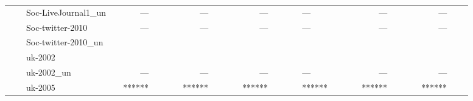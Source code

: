 \begin{sidewaystable*}[t!]
\begin{tabular}{|c|c|l|r|r|r|r|r|r|r|r|r|r|r|r|r|l|r|r|r|r|r|r|r|r|r|r|}
\multicolumn{ 1}{|c|}{} & \multicolumn{ 1}{c|}{} & Soc-LiveJournal1\_un & \multicolumn{1}{l|}{} & --- & \multicolumn{1}{l|}{} &  & \multicolumn{1}{l|}{} & --- &  &  & \multicolumn{1}{l|}{} & --- &  & \multicolumn{1}{l|}{} & \multicolumn{1}{l|}{} & --- &  & \multicolumn{1}{l|}{} & \multicolumn{1}{l|}{} & --- & \multicolumn{1}{l|}{} & \multicolumn{1}{l|}{} & \multicolumn{1}{l|}{} & --- & \multicolumn{1}{l|}{} & \multicolumn{1}{l|}{} \\ \cline{ 3- 27}
\multicolumn{ 1}{|c|}{} & \multicolumn{ 1}{c|}{} & Soc-twitter-2010 & \multicolumn{1}{l|}{} & --- & \multicolumn{1}{l|}{} &  & \multicolumn{1}{l|}{} & --- &  &  & \multicolumn{1}{l|}{} & --- &  & \multicolumn{1}{l|}{} & \multicolumn{1}{l|}{} & --- &  & \multicolumn{1}{l|}{} & \multicolumn{1}{l|}{} & --- & \multicolumn{1}{l|}{} & \multicolumn{1}{l|}{} & \multicolumn{1}{l|}{} & --- & \multicolumn{1}{l|}{} & \multicolumn{1}{l|}{} \\ \cline{ 3- 27}
\multicolumn{ 1}{|c|}{} & \multicolumn{ 1}{c|}{} & Soc-twitter-2010\_un & \multicolumn{1}{l|}{} &  & \multicolumn{1}{l|}{} &  & \multicolumn{1}{l|}{} &  &  &  & \multicolumn{1}{l|}{} &  &  & \multicolumn{1}{l|}{} & \multicolumn{1}{l|}{} &  &  & \multicolumn{1}{l|}{} & \multicolumn{1}{l|}{} &  & \multicolumn{1}{l|}{} & \multicolumn{1}{l|}{} & \multicolumn{1}{l|}{} &  & \multicolumn{1}{l|}{} & \multicolumn{1}{l|}{} \\ \cline{ 3- 27}
\multicolumn{ 1}{|c|}{} & \multicolumn{ 1}{c|}{} & uk-2002 & \multicolumn{1}{l|}{} &  & \multicolumn{1}{l|}{} &  & \multicolumn{1}{l|}{} &  &  &  & \multicolumn{1}{l|}{} &  &  & \multicolumn{1}{l|}{} & \multicolumn{1}{l|}{} &  &  & \multicolumn{1}{l|}{} & \multicolumn{1}{l|}{} &  & \multicolumn{1}{l|}{} & \multicolumn{1}{l|}{} & \multicolumn{1}{l|}{} &  & \multicolumn{1}{l|}{} & \multicolumn{1}{l|}{} \\ \cline{ 3- 27}
\multicolumn{ 1}{|c|}{} & \multicolumn{ 1}{c|}{} & uk-2002\_un & \multicolumn{1}{l|}{} & --- & \multicolumn{1}{l|}{} &  & \multicolumn{1}{l|}{} & --- &  &  & \multicolumn{1}{l|}{} & --- &  & \multicolumn{1}{l|}{} & \multicolumn{1}{l|}{} & --- &  & \multicolumn{1}{l|}{} & \multicolumn{1}{l|}{} & --- & \multicolumn{1}{l|}{} & \multicolumn{1}{l|}{} & \multicolumn{1}{l|}{} & --- & \multicolumn{1}{l|}{} & \multicolumn{1}{l|}{} \\ \cline{ 3- 27}
\multicolumn{ 1}{|c|}{} & \multicolumn{ 1}{c|}{} & uk-2005 & \multicolumn{1}{l|}{} & ****** & \multicolumn{1}{l|}{} &  & \multicolumn{1}{l|}{} & ****** &  &  & \multicolumn{1}{l|}{} & ****** &  & \multicolumn{1}{l|}{} & \multicolumn{1}{l|}{} & ****** &  & \multicolumn{1}{l|}{} & \multicolumn{1}{l|}{} & ****** & \multicolumn{1}{l|}{} & \multicolumn{1}{l|}{} & \multicolumn{1}{l|}{} & ****** & \multicolumn{1}{l|}{} & \multicolumn{1}{l|}{} \\ \cline{ 3- 27}

\end{tabular}
\end{sidewaystable*}
